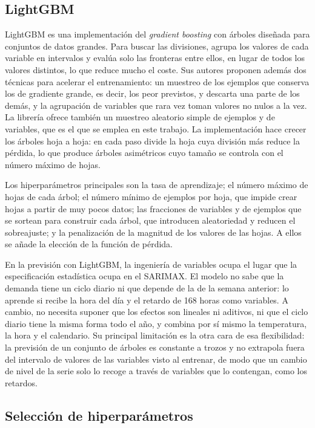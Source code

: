 \subsection{LightGBM}\label{sec:lightgbm}

LightGBM \parencite{ke2017lightgbm} es una implementación del
\textit{gradient boosting} con árboles diseñada para conjuntos de datos
grandes. Para buscar las divisiones, agrupa los valores de cada variable en
intervalos y evalúa solo las fronteras entre ellos, en lugar de todos los
valores distintos, lo que reduce mucho el coste. Sus autores proponen además
dos técnicas para acelerar el entrenamiento: un muestreo de los ejemplos que
conserva los de gradiente grande, es decir, los peor previstos, y descarta
una parte de los demás, y la agrupación de variables que rara vez toman
valores no nulos a la vez. La librería ofrece también un muestreo aleatorio
simple de ejemplos y de variables, que es el que se emplea en este trabajo. La implementación hace crecer los árboles hoja a
hoja: en cada paso divide la hoja cuya división más reduce la pérdida, lo que
produce árboles asimétricos cuyo tamaño se controla con el número máximo de
hojas.

Los hiperparámetros principales son la tasa de aprendizaje; el número máximo
de hojas de cada árbol; el número mínimo de ejemplos por hoja, que impide
crear hojas a partir de muy pocos datos; las fracciones de variables y de
ejemplos que se sortean para construir cada árbol, que introducen
aleatoriedad y reducen el sobreajuste; y la penalización de la magnitud de
los valores de las hojas. A ellos se añade la elección de la función de
pérdida.

En la previsión con LightGBM, la ingeniería de variables ocupa el lugar que
la especificación estadística ocupa en el SARIMAX. El modelo no sabe que la
demanda tiene un ciclo diario ni que depende de la de la semana anterior: lo
aprende si recibe la hora del día y el retardo de 168 horas como variables.
A cambio, no necesita suponer que los efectos son lineales ni aditivos, ni
que el ciclo diario tiene la misma forma todo el año, y combina por sí mismo
la temperatura, la hora y el calendario. Su principal limitación es la otra
cara de esa flexibilidad: la previsión de un conjunto de árboles es
constante a trozos y no extrapola fuera del intervalo de valores de las
variables visto al entrenar, de modo que un cambio de nivel de la serie solo
lo recoge a través de variables que lo contengan, como los retardos.

\subsection{Selección de hiperparámetros}\label{sec:hiperparametros}

